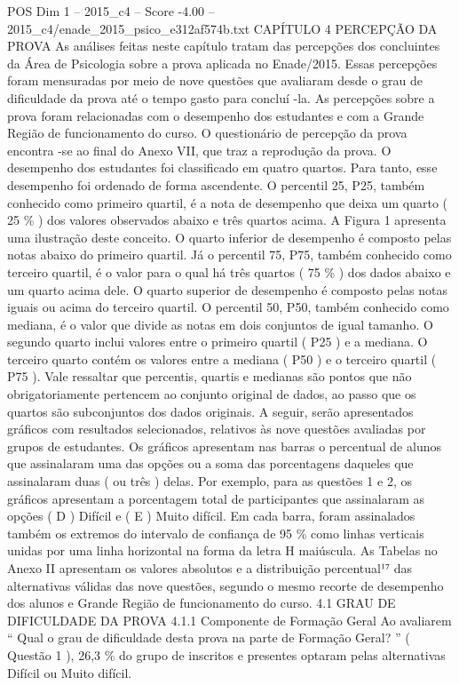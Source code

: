 \begin{textsample}{POS Dim 1 – 2015\_c4 – Score -4.00 – 2015\_c4/enade\_2015\_psico\_e312af574b.txt}  \label{ex:f1_pos_340}
CAPÍTULO 4 PERCEPÇÃO DA PROVA As análises feitas neste capítulo tratam das percepções dos concluintes da Área de Psicologia sobre a prova aplicada no Enade/2015.
Essas percepções foram mensuradas por meio de nove questões que avaliaram desde o grau de dificuldade da prova até o tempo gasto para concluí -la.
As percepções sobre a prova foram relacionadas com o desempenho dos estudantes e com a Grande Região de funcionamento do curso.
O questionário de percepção da prova encontra -se ao final do Anexo VII, que traz a reprodução da prova.
O desempenho dos estudantes foi classificado em quatro quartos.
Para tanto, esse desempenho foi ordenado de forma ascendente.
O percentil 25, P25, também conhecido como primeiro quartil, é a nota de desempenho que deixa um quarto ( 25 \% ) dos valores observados abaixo e três quartos acima.
A Figura 1 apresenta uma ilustração deste conceito.
O quarto inferior de desempenho é composto pelas notas abaixo do primeiro quartil.
Já o percentil 75, P75, também conhecido como terceiro quartil, é o valor para o qual há três quartos ( 75 \% ) dos dados abaixo e um quarto acima dele.
O quarto superior de desempenho é composto pelas notas iguais ou acima do terceiro quartil.
O percentil 50, P50, também conhecido como mediana, é o valor que divide as notas em dois conjuntos de igual tamanho.
O segundo quarto inclui valores entre o primeiro quartil ( P25 ) e a mediana.
O terceiro quarto contém os valores entre a mediana ( P50 ) e o terceiro quartil ( P75 ).
Vale ressaltar que percentis, quartis e medianas são pontos que não obrigatoriamente pertencem ao conjunto original de dados, ao passo que os quartos são subconjuntos dos dados originais.
A seguir, serão apresentados gráficos com resultados selecionados, relativos às nove questões avaliadas por grupos de estudantes.
Os gráficos apresentam nas barras o percentual de alunos que assinalaram uma das opções ou a soma das porcentagens daqueles que assinalaram duas ( ou três ) delas.
Por exemplo, para as questões 1 e 2, os gráficos apresentam a porcentagem total de participantes que assinalaram as opções ( D ) Difícil e ( E ) Muito difícil.
Em cada barra, foram assinalados também os extremos do intervalo de confiança de 95 \% como linhas verticais unidas por uma linha horizontal na forma da letra H maiúscula.
As Tabelas no Anexo II apresentam os valores absolutos e a distribuição percentual¹⁷ das alternativas válidas das nove questões, segundo o mesmo recorte de desempenho dos alunos e Grande Região de funcionamento do curso. 4.1 GRAU DE DIFICULDADE DA PROVA 4.1.1 Componente de Formação Geral Ao avaliarem “ Qual o grau de dificuldade desta prova na parte de Formação Geral? ” ( Questão 1 ), 26,3 \% do grupo de inscritos e presentes optaram pelas alternativas Difícil ou Muito difícil.

\end{textsample}
